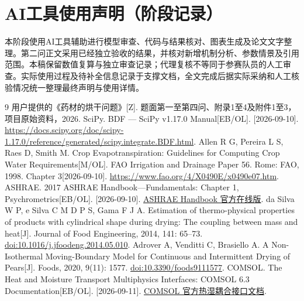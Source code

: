 \documentclass[UTF8,a4paper,zihao=-4,fontset=windows]{ctexart}
\begin{document}
\section*{AI工具使用声明（阶段记录）}
本阶段使用AI工具辅助进行模型审查、代码与结果核对、图表生成及论文文字整理。第二问正文采用已经独立验收的结果，并核对新增机制分析、参数情景及引用范围。本稿保留数值复算与独立审查记录；代理复核不等同于参赛队员的人工审查。实际使用过程及待补全信息记录于支撑文档，全文完成后据实际采纳和人工核验情况统一整理最终声明与使用详情。
\begin{thebibliography}{9}
\small
{} 用户提供的《药材的烘干问题》[Z]. 题面第一至第四问、附录1至4及附件1至3，项目原始资料，2026.
 SciPy. BDF --- SciPy v1.17.0 Manual[EB/OL]. [2026-09-10]. \url{https://docs.scipy.org/doc/scipy-1.17.0/reference/generated/scipy.integrate.BDF.html}.
 Allen R G, Pereira L S, Raes D, Smith M. Crop Evapotranspiration: Guidelines for Computing Crop Water Requirements[M/OL]. FAO Irrigation and Drainage Paper 56. Rome: FAO, 1998. Chapter 3[2026-09-10]. \url{https://www.fao.org/4/X0490E/x0490e07.htm}.
 ASHRAE. 2017 ASHRAE Handbook---Fundamentals: Chapter 1, Psychrometrics[EB/OL]. [2026-09-10]. \href{https://handbook.ashrae.org/Handbooks/F17/IP/f17_ch01/f17_ch01_ip.aspx}{ASHRAE Handbook 官方在线版}.
 da Silva W P, e Silva C M D P S, Gama F J A. Estimation of thermo-physical properties of products with cylindrical shape during drying: The coupling between mass and heat[J]. Journal of Food Engineering, 2014, 141: 65--73. \href{https://doi.org/10.1016/j.jfoodeng.2014.05.010}{doi:10.1016/j.jfoodeng.2014.05.010}.
 Adrover A, Venditti C, Brasiello A. A Non-Isothermal Moving-Boundary Model for Continuous and Intermittent Drying of Pears[J]. Foods, 2020, 9(11): 1577. \href{https://doi.org/10.3390/foods9111577}{doi:10.3390/foods9111577}.
 COMSOL. The Heat and Moisture Transport Multiphysics Interfaces: COMSOL 6.3 Documentation[EB/OL]. [2026-09-11]. \href{https://doc.comsol.com/6.3/doc/com.comsol.help.heat/heat_ug_multiphysics_interfaces.11.36.html}{COMSOL 官方热湿耦合接口文档}.
\end{thebibliography}
\end{document}
